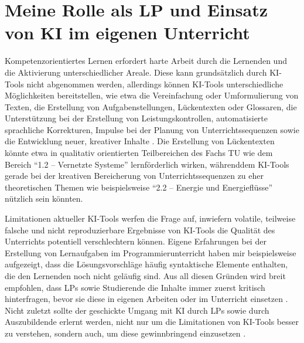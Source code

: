\section{Meine Rolle als \gls{LP} und Einsatz von \gls{KI} im eigenen Unterricht}
Kompetenzorientiertes Lernen erfordert harte Arbeit durch die Lernenden und die Aktivierung unterschiedlicher Areale. Diese kann grundsätzlich durch \gls{KI}-Tools nicht abgenommen werden, allerdings können \gls{KI}-Tools unterschiedliche Möglichkeiten bereitstellen, wie etwa die Vereinfachung oder Umformulierung von Texten, die Erstellung von Aufgabenstellungen, Lückentexten oder Glossaren, die Unterstützung bei der Erstellung von Leistungskontrollen, automatisierte sprachliche Korrekturen, Impulse bei der Planung von Unterrichtssequenzen sowie die Entwicklung neuer, kreativer Inhalte \cite{bbz}. Die Erstellung von Lückentexten könnte etwa in qualitativ orientierten Teilbereichen des Fachs \gls{TU} wie dem Bereich \enquote{1.2 -- Vernetzte Systeme} lernförderlich wirken, währenddem \gls{KI}-Tools gerade bei der kreativen Bereicherung von Unterrichtssequenzen zu eher theoretischen Themen wie beispielsweise \enquote{2.2 -- Energie und Energieflüsse} nützlich sein könnten.

Limitationen aktueller \gls{KI}-Tools werfen die Frage auf, inwiefern volatile, teilweise falsche und nicht reproduzierbare Ergebnisse von \gls{KI}-Tools die Qualität des Unterrichts potentiell verschlechtern können. Eigene Erfahrungen bei der Erstellung von Lernaufgaben im Programmierunterricht haben mir beispielsweise aufgezeigt, dass die Lösungsvorschläge häufig syntaktische Elemente enthalten, die den Lernenden noch nicht geläufig sind. Aus all diesen Gründen wird breit empfohlen, dass \glspl{LP} sowie Studierende die Inhalte immer zuerst kritisch hinterfragen, bevor sie diese in eigenen Arbeiten oder im Unterricht einsetzen \cite{bbz,bfh}. Nicht zuletzt sollte der geschickte Umgang mit \gls{KI} durch \glspl{LP} sowie durch Auszubildende erlernt werden, nicht nur um die Limitationen von \gls{KI}-Tools besser zu verstehen, sondern auch, um diese gewinnbringend einzusetzen \cite{nzzAS,nzzChatGPT}.

